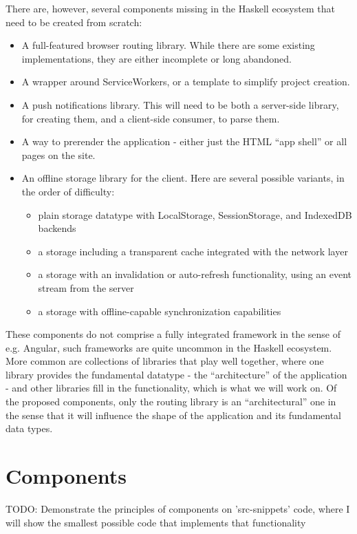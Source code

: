 \documentclass[english,odsaz]{fitthesis}
\begin{document}
There are, however, several components missing in the Haskell ecosystem that
need to be created from scratch:
\begin{itemize}
\item A full-featured browser routing library. While there are some existing
implementations, they are either incomplete or long abandoned.
\item A wrapper around ServiceWorkers, or a template to simplify project creation.
\item A push notifications library. This will need to be both a server-side library,
for creating them, and a client-side consumer, to parse them.
\item A way to prerender the application - either just the HTML ``app shell'' or all
pages on the site.
\item An offline storage library for the client. Here are several possible variants,
in the order of difficulty:
\begin{itemize}
\item plain storage datatype with LocalStorage, SessionStorage, and IndexedDB backends
\item a storage including a transparent cache integrated with the network layer
\item a storage with an invalidation or auto-refresh functionality, using an event
stream from the server
\item a storage with offline-capable synchronization capabilities
\end{itemize}
\end{itemize}

These components do not comprise a fully integrated framework in the sense of
e.g. Angular, such frameworks are quite uncommon in the Haskell ecosystem. More
common are collections of libraries that play well together, where one library
provides the fundamental datatype - the ``architecture'' of the application - and
other libraries fill in the functionality, which is what we will work on. Of the
proposed components, only the routing library is an ``architectural'' one in the
sense that it will influence the shape of the application and its fundamental
data types.

\chapter{Components}
\label{sec:org0d8e10a}
TODO: Demonstrate the principles of components on 'src-snippets' code, where
I will show the smallest possible code that implements that functionality
\end{document}
